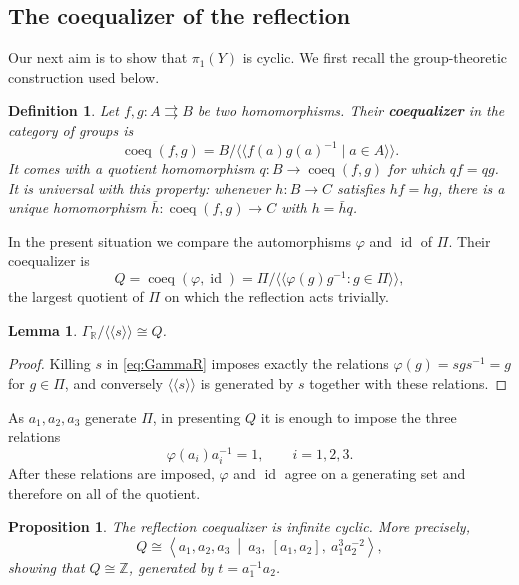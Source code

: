 \documentclass[11pt]{amsart}
\newtheorem{proposition}[theorem]{Proposition}
\newtheorem{lemma}[theorem]{Lemma}
\theoremstyle{definition}
\newtheorem{definition}[theorem]{Definition}
\theoremstyle{remark}
\newcommand{\Z}{\mathbb Z}
\newcommand{\PiCS}{\Pi}
\newcommand{\id}{\operatorname{id}}
\newcommand{\normal}[1]{\mathopen{\langle\!\langle}#1\mathclose{\rangle\!\rangle}}
\newcommand{\phiA}{\varphi}
\begin{document}
\subsection{The coequalizer of the reflection}
\label{sec:coequalizer-sub}

Our next aim is to show that $\pi_1(Y)$ is cyclic.
We first recall the group-theoretic construction used below.

\begin{definition}\label{def:coequalizer}
  {\it Let $f,g\colon A\rightrightarrows B$ be two homomorphisms.
    Their {\bf{\emph{coequalizer}}} in the category of groups is
\[
 \operatorname{coeq}(f,g)
 =B/\normal{f(a)g(a)^{-1}\mid a\in A}.
\]
It comes with a quotient homomorphism $q\colon B\to\operatorname{coeq}(f,g)$ for
which $qf=qg$.  It is universal with this property: whenever
$h\colon B\to C$ satisfies $hf=hg$, there is a unique
homomorphism $\bar h\colon \operatorname{coeq}(f,g)\to C$ with $h=\bar hq$.}
\end{definition}

In the present situation we compare the automorphisms $\phiA$ and $\id$ of
$\PiCS$. Their coequalizer is
\[
 Q=\operatorname{coeq}(\phiA,\id)
  =\PiCS/\normal{\phiA(g)g^{-1}:g\in\PiCS},
\]
the largest quotient of $\PiCS$ on which the reflection acts trivially.


\begin{lemma}\label{lem:kill-s}
$\Gamma_{\mathbb R}/\normal{s}\cong Q$.
\end{lemma}

\begin{proof}
Killing $s$ in \eqref{eq:GammaR} imposes exactly the relations
$\phiA(g)=sgs^{-1}=g$ for $g\in\PiCS$, and conversely $\normal{s}$ is
generated by $s$ together with these relations.\end{proof}

As $a_1,a_2,a_3$ generate $\PiCS$, in presenting $Q$ it is enough to impose the three
relations
\[
 \phiA(a_i)a_i^{-1}=1,\qquad i=1,2,3.
\]
After these relations are imposed, $\phiA$ and $\id$ agree on a generating set
and therefore on all of the quotient.

\begin{proposition}\label{prop:Q-Z}
The reflection coequalizer is infinite cyclic.  More precisely,
\begin{equation}\label{eq:marked-Q-presentation}
 Q\cong
 \left\langle a_1,a_2,a_3\ \middle|\
 a_3,\ [a_1,a_2],\ a_1^3a_2^{-2}
 \right\rangle ,
\end{equation}
showing that $Q\cong\Z$, generated by $t=a_1^{-1}a_2$.
\end{proposition}
\end{document}
